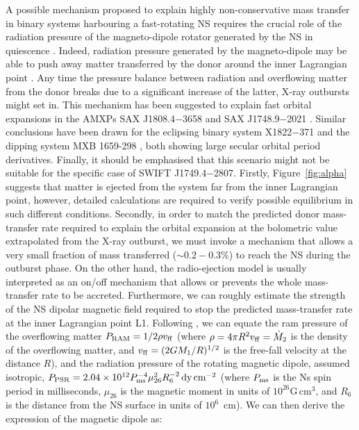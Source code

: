 \documentclass[fleqn,usenatbib]{mnras}
\newcommand{\swiftj}{SWIFT J1749.4$-$2807}
\begin{document}
A possible mechanism proposed to explain highly non-conservative mass transfer in binary systems harbouring a fast-rotating NS requires the crucial role of the radiation pressure of the magneto-dipole rotator generated by the NS in quiescence \citep[see e.g.,][]{Burderi:2003wk,di-Salvo:2008uu}. Indeed, radiation pressure generated by the magneto-dipole may be able to push away matter transferred by the donor around the inner Lagrangian point \citep[radio-ejection, see e.g.,][for a detailed discussion on the model]{Burderi:2001wp, di-Salvo:2008uu}. Any time the pressure balance between radiation and overflowing matter from the donor breaks due to a significant increase of the latter, X-ray outbursts might set in. This mechanism has been suggested to explain fast orbital expansions in the AMXPs SAX J1808.4$-$3658 \citep[see e.g.,][]{di-Salvo:2008uu,Burderi:2009td,Sanna:2017vj} and SAX J1748.9$-$2021 \citep[][]{Sanna:2016ty}. Similar conclusions have been drawn for the eclipsing binary system X1822$-$371 \citep{Burderi:2010tk,Iaria:2015ut} and the dipping system MXB 1659-298 \citep{Iaria:2018tq}, both showing large secular orbital period derivatives. Finally, it should be emphasised that this scenario might not be suitable for the specific case of \swiftj{}. Firstly, Figure~\ref{fig:alpha} suggests that matter is ejected from the system far from the inner Lagrangian point, however, detailed calculations are required to verify possible equilibrium in such different conditions. Secondly, in order to match the predicted donor mass-transfer rate required to explain the orbital expansion at the bolometric value extrapolated from the X-ray outburst, we must invoke a mechanism that allows a very small fraction of mass transferred ($\sim0.2-0.3\%$) to reach the NS during the outburst phase. On the other hand, the radio-ejection model is usually interpreted as an on/off mechanism that allows or prevents the whole mass-transfer rate to be accreted. Furthermore, we can roughly estimate the strength of the NS dipolar magnetic field required to stop the predicted mass-transfer rate at the inner Lagrangian point L1. Following \citet{Burderi:2002wk}, we can equate the ram pressure of the overflowing matter $P_{\rm RAM}=1/2 \rho v_{\rm ff}$ (where $\rho = 4 \pi R^2 v_{\rm ff}=\dot{M}_2$ is the density of the overflowing matter, and $v_{\rm ff}=(2 G M_1/R)^{1/2}$ is the free-fall velocity at the distance $R$), and the radiation pressure of the rotating magnetic dipole, assumed isotropic, $P_{\rm PSR}=2.04\times 10^{12} P^{-4}_{\rm ms}\mu^2_{26}R^{-2}_{6}\,\text{dy}\,\text{cm}^{-2}$ (where $P_{\rm ms}$ is the Ns spin period in milliseconds, $\mu_{26}$ is the magnetic moment in units of $10^{26}\text{G}\,\text{cm}^3$, and $R_{6}$ is the distance from the NS surface in units of $10^{6}$~cm). We can then derive the expression of the magnetic dipole as:
\end{document}
